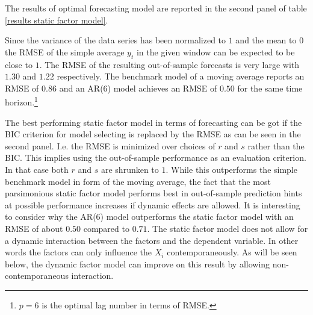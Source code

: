 \documentclass[12pt]{article}
\begin{document}
The results of optimal forecasting model are reported in the second panel of table \ref{results static factor model}.

Since the variance of the data series has been normalized to $1$ and the mean to $0$ the RMSE of the simple average $y_t$ in the given window can be expected to be close to $1$. The RMSE of the resulting out-of-sample forecasts is very large with $1.30$ and $1.22$ respectively. The benchmark model of a moving average reports an RMSE of $0.86$ and an AR(6) model achieves an RMSE of $0.50$ for the same time horizon.\footnote{$p=6$ is the optimal lag number in terms of RMSE.}

The best performing static factor model in terms of forecasting can be got if the BIC criterion for model selecting is replaced by the RMSE as can be seen in the second panel. I.e. the RMSE is minimized over choices of $r$ and $s$ rather than the BIC. This implies using the out-of-sample performance as an evaluation criterion. In that case both $r$ and $s$ are shrunken to $1$. While this outperforms the simple benchmark model in form of the moving average, the fact that the most parsimonious static factor model performs best in out-of-sample prediction hints at possible performance increases if dynamic effects are allowed. It is interesting to consider why the AR(6) model outperforms the static factor model with an RMSE of about $0.50$ compared to $0.71$. The static factor model does not allow for a dynamic interaction between the factors and the dependent variable. In other words the factors can only influence the $X_i$ contemporaneously. As will be seen below, the dynamic factor model can improve on this result by allowing non-contemporaneous interaction.
\end{document}
